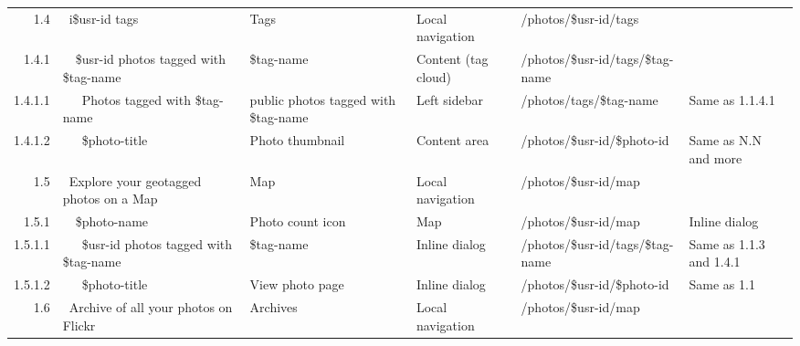 \documentclass[12pt,a4paper]{article}
\begin{document}
\begin{landscape}
\begin{table}[h!b!p!]
\begin{center}
\begin{tiny}
\begin{tabular}{r|l|l|l|l|p{3cm}}
              1.4 &
              ~i\$usr-id tags &
              Tags &
              Local navigation &
              /photos/\$usr-id/tags &
              \\

                1.4.1 &
                ~~\$usr-id photos tagged with \$tag-name &
                \$tag-name &
                Content (tag cloud) &
                /photos/\$usr-id/tags/\$tag-name &
                \\

                  1.4.1.1 &
                  ~~~Photos tagged with \$tag-name &
                  public photos tagged with \$tag-name &
                  Left sidebar &
                  /photos/tags/\$tag-name &
                  Same as 1.1.4.1 \\

                  1.4.1.2 &
                  ~~~\$photo-title &
                  Photo thumbnail &
                  Content area &
                  /photos/\$usr-id/\$photo-id &
                  Same as N.N and more\\

              1.5 &
              ~Explore your geotagged photos on a Map &
              Map &
              Local navigation &
              /photos/\$usr-id/map &
              \\

                1.5.1 &
                ~~\$photo-name &
                Photo count icon &
                Map &
                /photos/\$usr-id/map &
                Inline dialog\\

                  1.5.1.1 &
                  ~~~\$usr-id photos tagged with \$tag-name &
                  \$tag-name &
                  Inline dialog &
                  /photos/\$usr-id/tags/\$tag-name &
                  Same as 1.1.3 and 1.4.1\\

                  1.5.1.2 &
                  ~~~\$photo-title &
                  View photo page &
                  Inline dialog &
                  /photos/\$usr-id/\$photo-id &
                  Same as 1.1 \\

              1.6 &
              ~Archive of all your photos on Flickr &
              Archives &
              Local navigation &
              /photos/\$usr-id/map &
              \\


\end{tabular}
\end{tiny}
\end{center}
\end{table}
\end{landscape}
\end{document}
